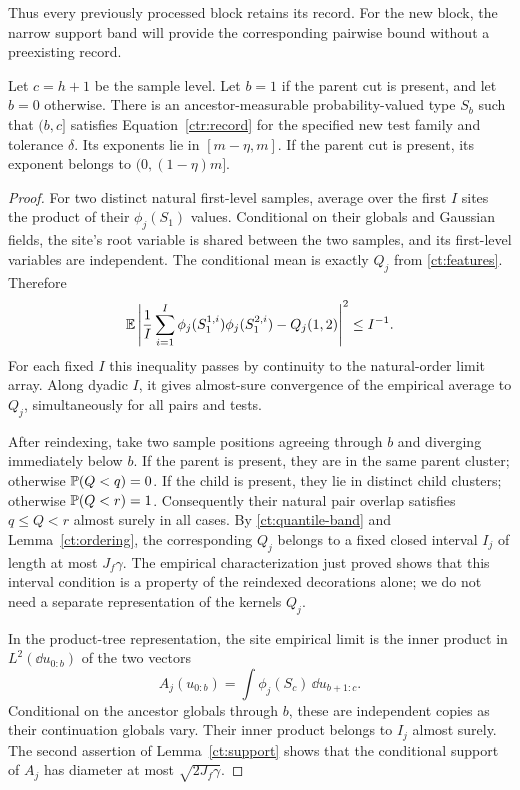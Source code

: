 Thus every previously processed block retains its record.  For the new
block, the narrow support band will provide the corresponding pairwise
bound without a preexisting record.

\begin{lemma}\label{ct:new-record}
Let $c=h+1$ be the sample level.  Let $b=1$ if the parent cut is
present, and let $b=0$ otherwise.  There is an ancestor-measurable
probability-valued type $S_b$ such that $(b,c]$ satisfies
Equation~\eqref{ctr:record} for the specified new test family
and tolerance $\delta$.  Its exponents lie in $[m-\eta,m]$.
If the parent cut is present, its exponent belongs to
$(0,(1-\eta)m]$.
\end{lemma}

\begin{proof}
For two distinct natural first-level samples, average over the
first $I$ sites the product of their $\phi_j(S_1)$ values.
Conditional on their globals and Gaussian fields, the site's
root variable is shared between the two samples, and its
first-level variables are independent.  The conditional mean
is exactly $Q_j$ from \eqref{ct:features}.  Therefore
\begin{equation}\label{ct:new-empirical-bound}
       \mathbb E\left|\frac1I\sum_{i=1}^I
              \phi_j(S_1^{1,i})\phi_j(S_1^{2,i})-Q_j(1,2)
          \right|^2\le I^{-1}.
\end{equation}
For each fixed $I$ this inequality passes by continuity to the
natural-order limit array.  Along dyadic $I$, it gives almost-sure
convergence of the empirical average to $Q_j$, simultaneously
for all pairs and tests.

After reindexing, take two sample positions agreeing through $b$
and diverging immediately below $b$.  If the parent is present,
they are in the same parent cluster; otherwise $\mathbb P(Q<q)=0$.
If the child is present, they lie in distinct child clusters;
otherwise $\mathbb P(Q<r)=1$.  Consequently their natural pair
overlap satisfies $q\le Q<r$ almost surely in all cases.
By \eqref{ct:quantile-band} and
Lemma~\ref{ct:ordering}, the corresponding $Q_j$ belongs to
a fixed closed interval $I_j$ of length at most $J_f\gamma$.
The empirical characterization just proved shows that this
interval condition is a property of the reindexed decorations
alone; we do not need a separate representation of the kernels
$Q_j$.

In the product-tree representation, the site empirical limit is
the inner product in $L^2(\dd u_{0:b})$ of the two vectors
\begin{equation}\label{ct:new-vectors}
          A_j(u_{0:b})=
                     \int\phi_j(S_c)\,\dd u_{b+1:c}.
\end{equation}
Conditional on the ancestor globals through $b$, these are
independent copies as their continuation globals vary.
Their inner product belongs to $I_j$ almost surely.
The second assertion of Lemma~\ref{ct:support} shows that
the conditional support of $A_j$ has diameter at most
$\sqrt{2J_f\gamma}$.


\end{proof}
